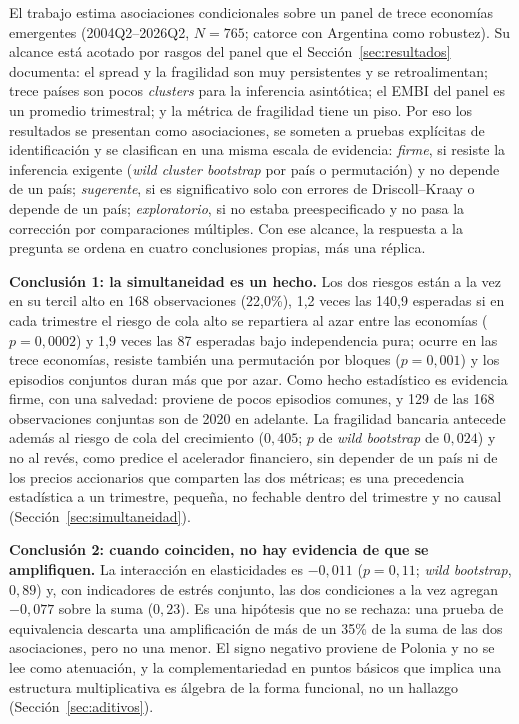 El trabajo estima asociaciones condicionales sobre un panel de trece economías emergentes (2004Q2--2026Q2, $N=765$; catorce con Argentina como robustez). Su alcance está acotado por rasgos del panel que el Sección~\ref{sec:resultados} documenta: el spread y la fragilidad son muy persistentes y se retroalimentan; trece países son pocos \textit{clusters} para la inferencia asintótica; el EMBI del panel es un promedio trimestral; y la métrica de fragilidad tiene un piso. Por eso los resultados se presentan como asociaciones, se someten a pruebas explícitas de identificación y se clasifican en una misma escala de evidencia: \emph{firme}, si resiste la inferencia exigente (\textit{wild cluster bootstrap} por país o permutación) y no depende de un país; \emph{sugerente}, si es significativo solo con errores de Driscoll--Kraay o depende de un país; \emph{exploratorio}, si no estaba preespecificado y no pasa la corrección por comparaciones múltiples. Con ese alcance, la respuesta a la pregunta se ordena en cuatro conclusiones propias, más una réplica.

\textbf{Conclusión 1: la simultaneidad es un hecho.} Los dos riesgos están a la vez en su tercil alto en 168 observaciones (22,0\%), 1,2 veces las 140,9 esperadas si en cada trimestre el riesgo de cola alto se repartiera al azar entre las economías ($p=0{,}0002$) y 1,9 veces las 87 esperadas bajo independencia pura; ocurre en las trece economías, resiste también una permutación por bloques ($p=0{,}001$) y los episodios conjuntos duran más que por azar. Como hecho estadístico es evidencia firme, con una salvedad: proviene de pocos episodios comunes, y 129 de las 168 observaciones conjuntas son de 2020 en adelante. La fragilidad bancaria antecede además al riesgo de cola del crecimiento ($0{,}405$; $p$ de \textit{wild bootstrap} de $0{,}024$) y no al revés, como predice el acelerador financiero, sin depender de un país ni de los precios accionarios que comparten las dos métricas; es una precedencia estadística a un trimestre, pequeña, no fechable dentro del trimestre y no causal (Sección~\ref{sec:simultaneidad}).

\textbf{Conclusión 2: cuando coinciden, no hay evidencia de que se amplifiquen.} La interacción en elasticidades es $-0{,}011$ ($p=0{,}11$; \textit{wild bootstrap}, $0{,}89$) y, con indicadores de estrés conjunto, las dos condiciones a la vez agregan $-0{,}077$ sobre la suma ($0{,}23$). Es una hipótesis que no se rechaza: una prueba de equivalencia descarta una amplificación de más de un 35\% de la suma de las dos asociaciones, pero no una menor. El signo negativo proviene de Polonia y no se lee como atenuación, y la complementariedad en puntos básicos que implica una estructura multiplicativa es álgebra de la forma funcional, no un hallazgo (Sección~\ref{sec:aditivos}).


